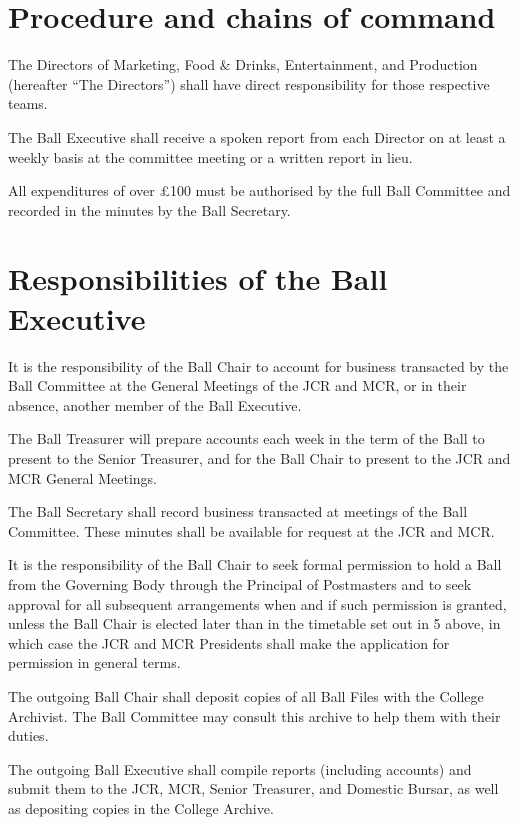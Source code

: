 \section{Procedure and chains of command}

\appnpara The Directors of Marketing, Food \& Drinks, Entertainment, and Production (hereafter “The Directors”) shall have direct responsibility for those respective teams. 

\appnpara The Ball Executive shall receive a spoken report from each Director on at least a weekly basis at the committee meeting or a written report in lieu.

\appnpara All expenditures of over £100 must be authorised by the full Ball Committee and recorded in the minutes by the Ball Secretary.

\section{Responsibilities of the Ball Executive}

\appnpara It is the responsibility of the Ball Chair to account for business transacted by the Ball Committee at the General Meetings of the JCR and MCR, or in their absence, another member of the Ball Executive.

\appnpara The Ball Treasurer will prepare accounts each week in the term of the Ball to present to the Senior Treasurer, and for the Ball Chair to present to the JCR and MCR General Meetings.

\appnpara The Ball Secretary shall record business transacted at meetings of the Ball Committee.  These minutes shall be available for request at the JCR and MCR.

\appnpara It is the responsibility of the Ball Chair to seek formal permission to hold a Ball from the Governing Body through the Principal of Postmasters and to seek approval for all subsequent arrangements when and if such permission is granted, unless the Ball Chair is elected later than in the timetable set out in 5 above, in which case the JCR and MCR Presidents shall make the application for permission in general terms.

\appnpara The outgoing Ball Chair shall deposit copies of all Ball Files with the College Archivist.  The Ball Committee may consult this archive to help them with their duties.

\appnpara The outgoing Ball Executive shall compile reports (including accounts) and submit them to the JCR, MCR, Senior Treasurer, and Domestic Bursar, as well as depositing copies in the College Archive.  

